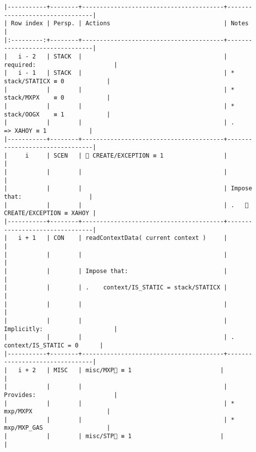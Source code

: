 \documentclass[varwidth=\maxdimen,margin=0.5cm,multi={verbatim}]{standalone}
\begin{document}
\begin{verbatim}
|-----------+--------+----------------------------------------+--------------------------------|
| Row index | Persp. | Actions                                | Notes                          |
|:---------:+--------+----------------------------------------+--------------------------------|
|   i - 2   | STACK  |                                        | required:                      |
|   i - 1   | STACK  |                                        | * stack/STATICX ≡ 0            |
|           |        |                                        | * stack/MXPX    ≡ 0            |
|           |        |                                        | * stack/OOGX    ≡ 1            |
|           |        |                                        | .      => XAHOY ≡ 1            |
|-----------+--------+----------------------------------------+--------------------------------|
|     i     | SCEN   |  CREATE/EXCEPTION ≡ 1                 |                                |
|           |        |                                        |                                |
|           |        |                                        | Impose that:                   |
|           |        |                                        | .    CREATE/EXCEPTION ≡ XAHOY |
|-----------+--------+----------------------------------------+--------------------------------|
|   i + 1   | CON    | readContextData( current context )     |                                |
|           |        |                                        |                                |
|           |        | Impose that:                           |                                |
|           |        | .    context/IS_STATIC = stack/STATICX |                                |
|           |        |                                        |                                |
|           |        |                                        | Implicitly:                    |
|           |        |                                        | .   context/IS_STATIC = 0      |
|-----------+--------+----------------------------------------+--------------------------------|
|   i + 2   | MISC   | misc/MXP🚩 ≡ 1                         |                                |
|           |        |                                        | Provides:                      |
|           |        |                                        | * mxp/MXPX                     |
|           |        |                                        | * mxp/MXP_GAS                  |
|           |        | misc/STP🚩 ≡ 1                         |                                |

\end{verbatim}
\end{document}
